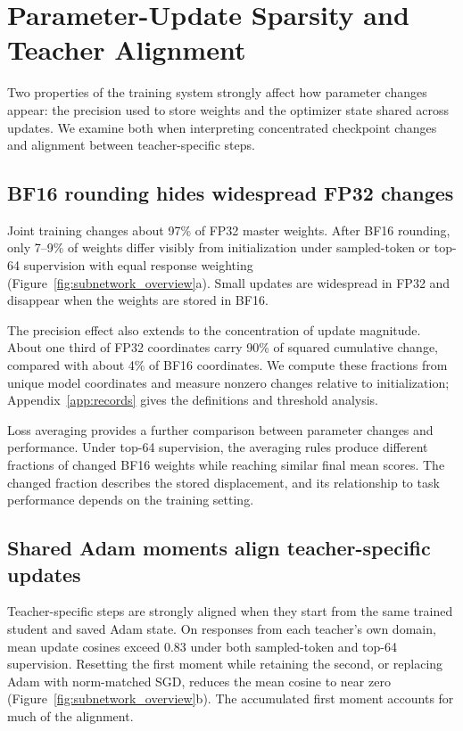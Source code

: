 \section{Parameter-Update Sparsity and Teacher Alignment}
\label{sec:subnetworks}

Two properties of the training system strongly affect how parameter changes appear: the precision used to store weights and the optimizer state shared across updates. We examine both when interpreting concentrated checkpoint changes \citep{yu2026denseupdates} and alignment between teacher-specific steps.

\subsection{BF16 rounding hides widespread FP32 changes}

Joint training changes about 97\% of FP32 master weights. After BF16 rounding, only 7--9\% of weights differ visibly from initialization under sampled-token or top-64 supervision with equal response weighting (Figure~\ref{fig:subnetwork_overview}a). Small updates are widespread in FP32 and disappear when the weights are stored in BF16.

The precision effect also extends to the concentration of update magnitude. About one third of FP32 coordinates carry 90\% of squared cumulative change, compared with about 4\% of BF16 coordinates. We compute these fractions from unique model coordinates and measure nonzero changes relative to initialization; Appendix~\ref{app:records} gives the definitions and threshold analysis.

Loss averaging provides a further comparison between parameter changes and performance. Under top-64 supervision, the averaging rules produce different fractions of changed BF16 weights while reaching similar final mean scores. The changed fraction describes the stored displacement, and its relationship to task performance depends on the training setting.



\subsection{Shared Adam moments align teacher-specific updates}

Teacher-specific steps are strongly aligned when they start from the same trained student and saved Adam state. On responses from each teacher's own domain, mean update cosines exceed 0.83 under both sampled-token and top-64 supervision. Resetting the first moment while retaining the second, or replacing Adam with norm-matched SGD, reduces the mean cosine to near zero (Figure~\ref{fig:subnetwork_overview}b). The accumulated first moment accounts for much of the alignment.

